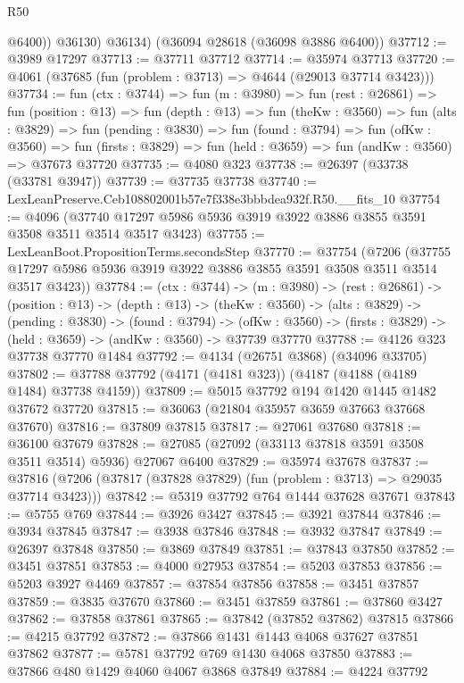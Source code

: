 \begin{lexlean}{R50}
\begin{coremodule}
            @6400))
        @36130)
      @36134)
    (@36094 @28618 (@36098 @3886 @6400))
@37712 := @3989 @17297
@37713 := @37711 @37712
@37714 := @35974 @37713
@37720 := @4061 (@37685 (fun (problem : @3713) => @4644 (@29013 @37714 @3423)))
@37734 := fun (ctx : @3744) =>
  fun (m : @3980) =>
  fun (rest : @26861) =>
  fun (position : @13) =>
  fun (depth : @13) =>
  fun (theKw : @3560) =>
  fun (alts : @3829) =>
  fun (pending : @3830) =>
  fun (found : @3794) =>
  fun (ofKw : @3560) =>
  fun (firsts : @3829) => fun (held : @3659) => fun (andKw : @3560) => @37673 @37720
@37735 := @4080 @323
@37738 := @26397 (@33738 (@33781 @3947))
@37739 := @37735 @37738
@37740 := LexLeanPreserve.Ceb108802001b57e7f338e3bbbdea932f.R50.__fits_10
@37754 := @4096
    (@37740 @17297 @5986 @5936 @3919 @3922 @3886 @3855 @3591 @3508 @3511 @3514 @3517 @3423)
@37755 := LexLeanBoot.PropositionTerms.secondsStep
@37770 := @37754
    (@7206 (@37755 @17297 @5986 @5936 @3919 @3922 @3886 @3855 @3591 @3508 @3511 @3514 @3517 @3423))
@37784 := (ctx : @3744) ->
  (m : @3980) ->
  (rest : @26861) ->
  (position : @13) ->
  (depth : @13) ->
  (theKw : @3560) ->
  (alts : @3829) ->
  (pending : @3830) ->
  (found : @3794) ->
  (ofKw : @3560) -> (firsts : @3829) -> (held : @3659) -> (andKw : @3560) -> @37739 @37770
@37788 := @4126 @323 @37738 @37770 @1484
@37792 := @4134 (@26751 @3868) (@34096 @33705)
@37802 := @37788 @37792 (@4171 (@4181 @323)) (@4187 (@4188 (@4189 @1484) @37738 @4159))
@37809 := @5015 @37792 @194 @1420 @1445 @1482 @37672 @37720
@37815 := @36063 (@21804 @35957 @3659 @37663 @37668 @37670)
@37816 := @37809 @37815
@37817 := @27061 @37680
@37818 := @36100 @37679
@37828 := @27085 (@27092 (@33113 @37818 @3591 @3508 @3511 @3514) @5936) @27067 @6400
@37829 := @35974 @37678
@37837 := @37816 (@7206 (@37817 (@37828 @37829) (fun (problem : @3713) => @29035 @37714 @3423)))
@37842 := @5319 @37792 @764 @1444 @37628 @37671
@37843 := @5755 @769
@37844 := @3926 @3427
@37845 := @3921 @37844
@37846 := @3934 @37845
@37847 := @3938 @37846
@37848 := @3932 @37847
@37849 := @26397 @37848
@37850 := @3869 @37849
@37851 := @37843 @37850
@37852 := @3451 @37851
@37853 := @4000 @27953
@37854 := @5203 @37853
@37856 := @5203 @3927 @4469
@37857 := @37854 @37856
@37858 := @3451 @37857
@37859 := @3835 @37670
@37860 := @3451 @37859
@37861 := @37860 @3427
@37862 := @37858 @37861
@37865 := @37842 (@37852 @37862) @37815
@37866 := @4215 @37792
@37872 := @37866 @1431 @1443 @4068 @37627 @37851 @37862
@37877 := @5781 @37792 @769 @1430 @4068 @37850
@37883 := @37866 @480 @1429 @4060 @4067 @3868 @37849
@37884 := @4224 @37792

\end{coremodule}
\end{lexlean}
